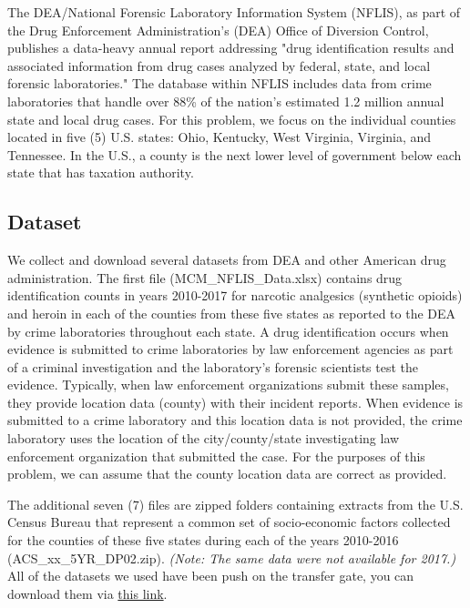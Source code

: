 \documentclass[a4paper]{article}
\begin{document}
The DEA/National Forensic Laboratory Information System (NFLIS), as part of the Drug Enforcement Administration's (DEA) Office of Diversion Control, publishes a data-heavy annual report addressing "drug identification results and associated information from drug cases analyzed by federal, state, and local forensic laboratories." The database within NFLIS includes data from crime laboratories that handle over 88\% of the nation's estimated 1.2 million annual state and local drug cases. For this problem, we focus on the individual counties located in five (5) U.S. states: Ohio, Kentucky, West Virginia, Virginia, and Tennessee. In the U.S., a county is the next lower level of government below each state that has taxation authority.

\subsection{Dataset}

We collect and download several datasets from DEA and other American drug administration. The first file (MCM\_NFLIS\_Data.xlsx) contains drug identification counts in years 2010-2017 for narcotic analgesics (synthetic opioids) and heroin in each of the counties from these five states as reported to the DEA by crime laboratories throughout each state. A drug identification occurs when evidence is submitted to crime laboratories by law enforcement agencies as part of a criminal investigation and the laboratory’s forensic scientists test the evidence. Typically, when law enforcement organizations submit these samples, they provide location data (county) with their incident reports. When evidence is submitted to a crime laboratory and this location data is not provided, the crime laboratory uses the location of the city/county/state investigating law enforcement organization that submitted the case. For the purposes of this problem, we can assume that the county location data are correct as provided.

The additional seven (7) files are zipped folders containing extracts from the U.S. Census Bureau that represent a common set of socio-economic factors collected for the counties of these five states during each of the years 2010-2016 (ACS\_xx\_5YR\_DP02.zip). \textit{(Note: The same data were not available for 2017.)} All of the datasets we used have been push on the transfer gate, you can download them via \href{https://github.com/LovelyBuggies/Python_2019MCM_OpioidCrisis/raw/master/Problems/dataset.zip}{this link}.
\end{document}
